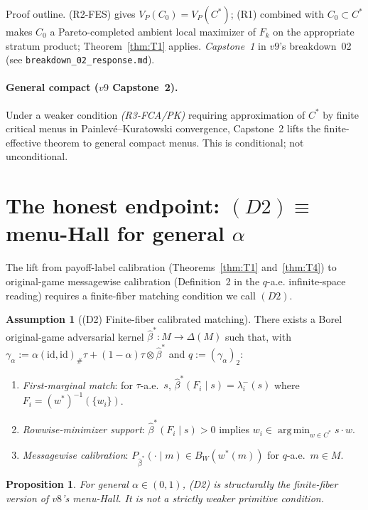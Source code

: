 \documentclass[11pt]{article}
\newtheorem{proposition}[theorem]{Proposition}
\theoremstyle{definition}
\newtheorem{assumption}{Assumption}
\theoremstyle{remark}
\newcommand{\argmin}{\operatorname*{arg\,min}}
\begin{document}
\noindent Proof outline. (R2-FES) gives $V_P(C_0) = V_P(C^*)$; (R1)
combined with $C_0\subset C^*$ makes $C_0$ a Pareto-completed ambient
local maximizer of $F_k$ on the appropriate stratum product;
Theorem~\ref{thm:T1} applies. \emph{Capstone~1} in $v9$'s breakdown~02
(see \texttt{breakdown\_02\_response.md}).

\paragraph{General compact ($v9$ Capstone~2).} Under a weaker condition
\emph{(R3-FCA/PK)} requiring approximation of $C^*$ by finite critical
menus in Painlev\'e--Kuratowski convergence, Capstone~2 lifts the
finite-effective theorem to general compact menus. This is conditional;
not unconditional.

\section{The honest endpoint: $(D2)\equiv$ menu-Hall for general $\alpha$}\label{sec:d2}

The lift from payoff-label calibration (Theorems~\ref{thm:T1}
and~\ref{thm:T4}) to original-game messagewise calibration
(Definition~2 in the $q$-a.e. infinite-space reading) requires a
finite-fiber matching condition we call $(D2)$.

\begin{assumption}[(D2) Finite-fiber calibrated matching]\label{ass:D2}
There exists a Borel original-game adversarial kernel $\hat\beta^*:M\to\Delta(M)$
such that, with $\gamma_\alpha := \alpha(\mathrm{id},\mathrm{id})_\#\tau + (1-\alpha)\tau\otimes\hat\beta^*$
and $q := (\gamma_\alpha)_2$:
\begin{enumerate}[label=(D2.\arabic*)]
  \item \emph{First-marginal match}: for $\tau$-a.e.\ $s$,
    $\hat\beta^*(F_i\mid s) = \lambda^-_i(s)$ where
    $F_i = (w^*)^{-1}(\{w_i\})$.
  \item \emph{Rowwise-minimizer support}: $\hat\beta^*(F_i\mid s)>0$
    implies $w_i\in\argmin_{w\in C^*}s\!\cdot w$.
  \item \emph{Messagewise calibration}: $P_{\hat\beta^*}(\cdot\mid m)\in B_W(w^*(m))$
    for $q$-a.e.\ $m\in M$.
\end{enumerate}
\end{assumption}

\begin{proposition}\label{prop:D2equiv}
For general $\alpha\in(0,1)$, (D2) is structurally the finite-fiber
version of $v8$'s menu-Hall. It is not a strictly weaker primitive
condition.
\end{proposition}
\end{document}
